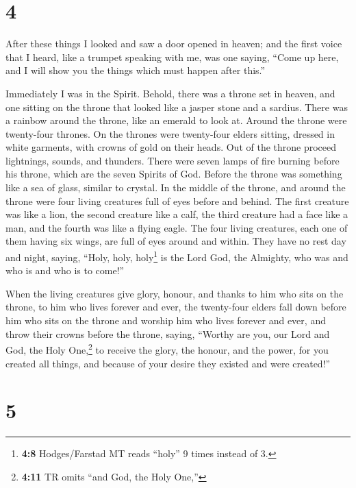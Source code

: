 \hypertarget{section-3}{%
\section{4}\label{section-3}}

 After these things I looked and saw a door opened in
heaven; and the first voice that I heard, like a trumpet speaking with
me, was one saying, ``Come up here, and I will show you the things which
must happen after this.''

 Immediately I was in the Spirit. Behold, there was a
throne set in heaven, and one sitting on the throne  that
looked like a jasper stone and a sardius. There was a rainbow around the
throne, like an emerald to look at.  Around the throne
were twenty-four thrones. On the thrones were twenty-four elders
sitting, dressed in white garments, with crowns of gold on their heads.
 Out of the throne proceed lightnings, sounds, and
thunders. There were seven lamps of fire burning before his throne,
which are the seven Spirits of God.  Before the throne was
something like a sea of glass, similar to crystal. In the middle of the
throne, and around the throne were four living creatures full of eyes
before and behind.  The first creature was like a lion,
the second creature like a calf, the third creature had a face like a
man, and the fourth was like a flying eagle.  The four
living creatures, each one of them having six wings, are full of eyes
around and within. They have no rest day and night, saying, ``Holy,
holy, holy\footnote{\textbf{4:8} Hodges/Farstad MT reads ``holy'' 9
  times instead of 3.} is the Lord God, the Almighty, who was and who is
and who is to come!''

 When the living creatures give glory, honour, and thanks
to him who sits on the throne, to him who lives forever and ever,
 the twenty-four elders fall down before him who sits on
the throne and worship him who lives forever and ever, and throw their
crowns before the throne, saying,  ``Worthy are you, our
Lord and God, the Holy One,\footnote{\textbf{4:11} TR omits ``and God,
  the Holy One,''} to receive the glory, the honour, and the power, for
you created all things, and because of your desire they existed and were
created!''

\hypertarget{section-4}{%
\section{5}\label{section-4}}

